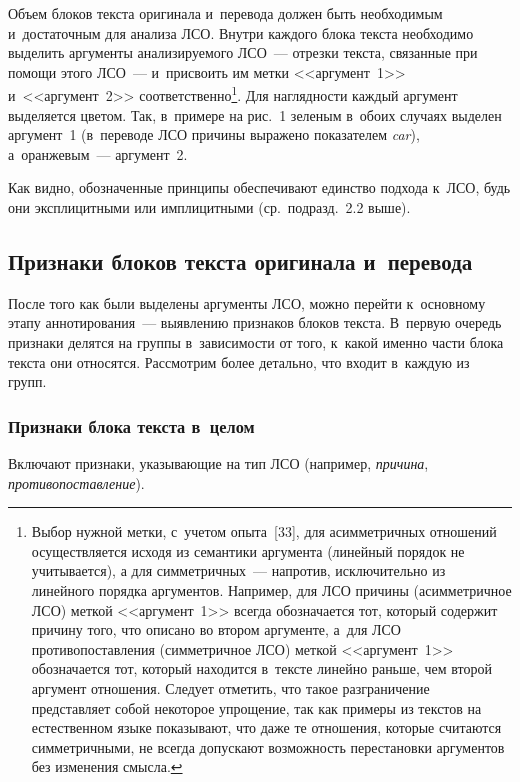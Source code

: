\begin{multicols}{2}
Объем блоков текста оригинала и~перевода должен быть необходимым 
и~достаточным для анализа ЛСО. Внутри каждого блока текста необходимо 
выделить аргументы анализируемого ЛСО~--- отрезки текста, связанные при 
помощи этого ЛСО~--- и~присвоить им метки <<аргумент~1>> 
и~<<аргумент~2>> соответственно\footnote{Выбор нужной метки, с~учетом 
опыта~[33], для асимметричных отношений осуществляется исходя из семантики аргумента 
(линейный порядок не учитывается), а для симметричных~--- напротив, исключительно из 
линейного порядка аргументов. Например, для ЛСО причины (асимметричное ЛСО) меткой 
<<аргумент~1>> всегда обозначается тот, который содержит причину того, что описано во втором 
аргументе, а~для ЛСО противопоставления (симметричное ЛСО) меткой <<аргумент~1>> 
обозначается тот, который находится в~тексте линейно раньше, чем второй аргумент отношения. 
Следует отметить, что такое разграничение представляет собой некоторое упрощение, так как 
примеры из текстов на естественном языке показывают, что даже те отношения, которые 
считаются симметричными, не всегда допускают возможность перестановки аргументов без 
изменения смыс\-ла.}. Для наглядности каждый аргумент выделяется цветом. Так, 
в~примере на рис.~1 зеленым в~обоих случаях выделен аргумент~1 
(в~переводе ЛСО причины выражено показателем \textit{car}), 
а~оранжевым~--- аргумент~2.



Как видно, обозначенные принципы обеспечивают единство подхода к~ЛСО, 
будь они эксплицитными или имплицитными (ср.\ подразд.~2.2 выше).

\subsection{Признаки блоков текста оригинала и~перевода}

После того как были выделены аргументы ЛСО, можно перейти к~основному этапу аннотирования~--- выявлению 
признаков блоков текста.
В~первую очередь признаки делятся на группы в~зависимости от того, к~какой 
именно части блока текста они относятся. Рассмотрим более детально, что 
входит в~каждую из групп.

\subsubsection{Признаки блока текста в~целом}

 Включают признаки, указывающие на тип ЛСО (например, \textit{причина}, \textit{противопоставление}).


\end{multicols}
